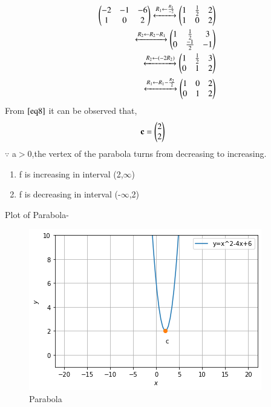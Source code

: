 \documentclass[journal,12pt,twocolumn]{IEEEtran}
\begin{document}
\begin{align}
\begin{pmatrix}-2 & -1 & -6\\1 & 0 & 2\end{pmatrix} 
\xleftrightarrow{R_1\leftarrow \frac{R_1}{-2}}\begin{pmatrix}1 & \frac{1}{2} & 2\\1 & 0 & 2\end{pmatrix} 
\\
\xleftrightarrow{R_2\leftarrow R_2 -R_1}\begin{pmatrix}1 & \frac{1}{2} & 3 \\0 & \frac{-1}{2} & -1\end{pmatrix}
\\
\xleftrightarrow{R_2\leftarrow (-2R_2)}\begin{pmatrix}1 & \frac{1}{2} & 3 \\0 & 1 & 2\end{pmatrix}
\\
\xleftrightarrow{R_1\leftarrow R_1 - \frac{R_2}{2}}\begin{pmatrix}1 & 0 & 2\\0 & 1 & 2\end{pmatrix}   \label{eq8}
\end{align}
From $\eqref{eq8}$ it can be observed that,
\begin{align}
\mathbf{c} &= \begin{pmatrix}2 \\ 2\end{pmatrix}
\end{align}
$\because$ a$>$0,the vertex of the parabola turns from decreasing to increasing.

\begin{enumerate}
\item f is increasing in interval (2,$\infty$)
\item f is decreasing in interval (-$\infty$,2)
\end{enumerate}

Plot of Parabola-
\begin{figure}[ht]
    \centering
    \includegraphics[width=\columnwidth]{Figure.png}
    \caption{Parabola}
    \label{fig:Prarabola}
\end{figure}    
\end{document}
